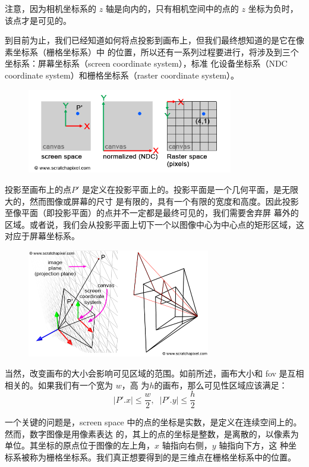 \documentclass[12pt]{article}
\begin{document}
\noindent{}注意，因为相机坐标系的 $z$ 轴是向内的，只有相机空间中的点的 $z$ 坐标为负时，该点才是可见的。

\indent{}到目前为止，我们已经知道如何将点投影到画布上，但我们最终想知道的是它在像素坐标系（栅格坐标系）中
的位置，所以还有一系列过程要进行，将涉及到三个坐标系：屏幕坐标系（screen coordinate system），标准
化设备坐标系（NDC coordinate system）和栅格坐标系（raster coordinate system）。

\begin{figure}[h]
\centering
\includegraphics[width=9cm]{./imgs/screen_ndc_raster.png}
\end{figure}

\indent{}投影至画布上的点$P'$ 是定义在投影平面上的。投影平面是一个几何平面，是无限大的，然而图像或屏幕的尺寸
是有限的，具有一个有限的宽度和高度。因此投影至像平面（即投影平面）的点并不一定都是最终可见的，我们需要舍弃屏
幕外的区域。或者说，我们会从投影平面上切下一个以图像中心为中心点的矩形区域，这对应于屏幕坐标系。

\begin{figure}[h]
\centering
\includegraphics[width=8cm]{./imgs/screen.png}
\end{figure}

\indent{}当然，改变画布的大小会影响可见区域的范围。如前所述，画布大小和 fov 是互相相关的。如果我们有一个宽为 $w$，高
为$h$的画布，那么可见性区域应该满足：
\begin{displaymath}
|P'.x| \leqslant \frac{w}{2}, \;\; |P'.y| \leqslant \frac{h}{2}
\end{displaymath}

\indent{}一个关键的问题是，screen space 中的点的坐标是实数，是定义在连续空间上的。然而，数字图像是用像素表达
的，其上的点的坐标是整数，是离散的，以像素为单位。其坐标的原点位于图像的左上角，$x$ 轴指向右侧，$y$ 轴指向下方，这
种坐标系被称为栅格坐标系。我们真正想要得到的是三维点在栅格坐标系中的位置。
\end{document}
